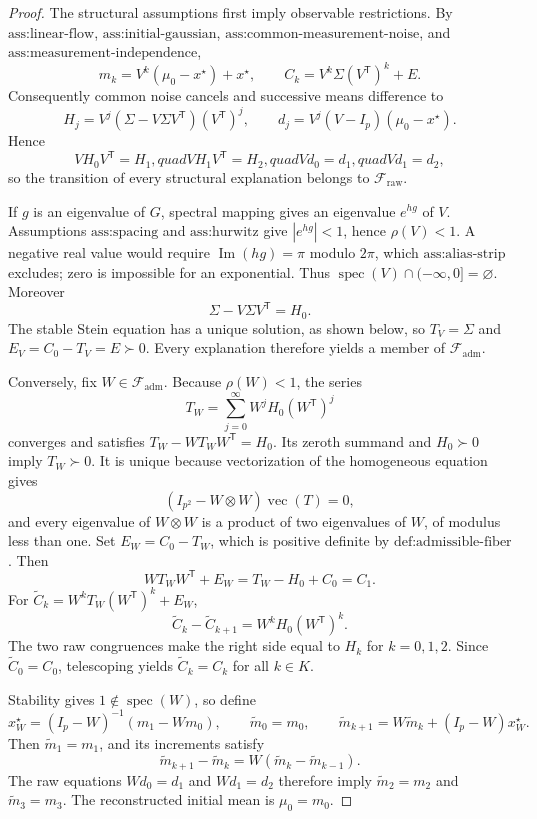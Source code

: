 \documentclass{article}
\begin{document}
\begin{proof}
The structural assumptions first imply observable restrictions.  By \(\text{ass:linear-flow}\), \(\text{ass:initial-gaussian}\), \(\text{ass:common-measurement-noise}\), and \(\text{ass:measurement-independence}\),
\[
 m_k=V^k(\mu_0-x^\star)+x^\star,
 \qquad C_k=V^k\Sigma(V^{\mathsf T})^k+E.
\]
Consequently common noise cancels and successive means difference to
\[
 H_j=V^j(\Sigma-V\Sigma V^{\mathsf T})(V^{\mathsf T})^j,
 \qquad d_j=V^j(V-I_p)(\mu_0-x^\star).
\]
Hence
\[
 VH_0V^{\mathsf T}=H_1,quad VH_1V^{\mathsf T}=H_2,quad
 Vd_0=d_1,quad Vd_1=d_2,
\]
so the transition of every structural explanation belongs to \(\mathcal F_{\mathrm{raw}}\).

If \(g\) is an eigenvalue of \(G\), spectral mapping gives an eigenvalue \(e^{hg}\) of \(V\).  Assumptions \(\text{ass:spacing}\) and \(\text{ass:hurwitz}\) give \(|e^{hg}|<1\), hence \(\rho(V)<1\).  A negative real value would require \(\operatorname{Im}(hg)=\pi\) modulo \(2\pi\), which \(\text{ass:alias-strip}\) excludes; zero is impossible for an exponential.  Thus \(\operatorname{spec}(V)\cap(-\infty,0]=\varnothing\).  Moreover
\[
 \Sigma-V\Sigma V^{\mathsf T}=H_0.
\]
The stable Stein equation has a unique solution, as shown below, so \(T_V=\Sigma\) and \(E_V=C_0-T_V=E\succ0\).  Every explanation therefore yields a member of \(\mathcal F_{\mathrm{adm}}\).

Conversely, fix \(W\in\mathcal F_{\mathrm{adm}}\).  Because \(\rho(W)<1\), the series
\[
 T_W=\sum_{j=0}^{\infty}W^jH_0(W^{\mathsf T})^j
\]
converges and satisfies \(T_W-WT_WW^{\mathsf T}=H_0\).  Its zeroth summand and \(H_0\succ0\) imply \(T_W\succ0\).  It is unique because vectorization of the homogeneous equation gives
\[
 (I_{p^2}-W\otimes W)\operatorname{vec}(T)=0,
\]
and every eigenvalue of \(W\otimes W\) is a product of two eigenvalues of \(W\), of modulus less than one.  Set \(E_W=C_0-T_W\), which is positive definite by \(\text{def:admissible-fiber}\).  Then
\[
 WT_WW^{\mathsf T}+E_W=T_W-H_0+C_0=C_1.
\]
For \(\widetilde C_k=W^kT_W(W^{\mathsf T})^k+E_W\),
\[
 \widetilde C_k-\widetilde C_{k+1}=W^kH_0(W^{\mathsf T})^k.
\]
The two raw congruences make the right side equal to \(H_k\) for \(k=0,1,2\).  Since \(\widetilde C_0=C_0\), telescoping yields \(\widetilde C_k=C_k\) for all \(k\in K\).

Stability gives \(1\notin\operatorname{spec}(W)\), so define
\[
 x_W^\star=(I_p-W)^{-1}(m_1-Wm_0),
 \qquad \widetilde m_0=m_0,
 \qquad \widetilde m_{k+1}=W\widetilde m_k+(I_p-W)x_W^\star.
\]
Then \(\widetilde m_1=m_1\), and its increments satisfy
\[
 \widetilde m_{k+1}-\widetilde m_k
 =W(\widetilde m_k-\widetilde m_{k-1}).
\]
The raw equations \(Wd_0=d_1\) and \(Wd_1=d_2\) therefore imply \(\widetilde m_2=m_2\) and \(\widetilde m_3=m_3\).  The reconstructed initial mean is \(\mu_0=m_0\).


\end{proof}
\end{document}
